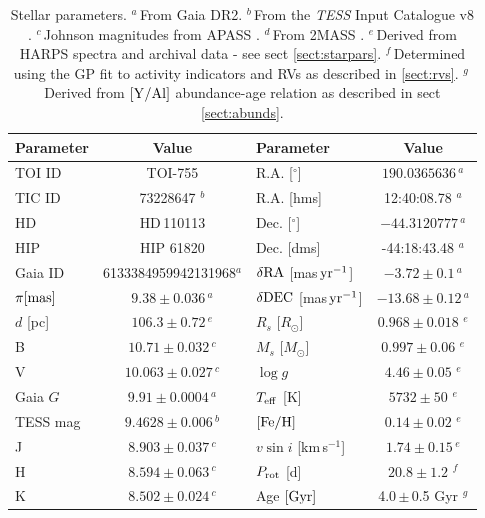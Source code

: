 \documentclass[fleqn,usenatbib]{mnras}
\newcommand{\tess}{{\it TESS}}
\newcommand{\harps}{{HARPS}}
\newcommand{\kms}{km\,s$^{-1}$}
\newcommand{\msun}{\mbox{$M_{\odot}$}}
\newcommand{\rsun}{\mbox{$R_{\odot}$}}
\newcommand{\vsini}{$v\sin{i}$}
\newcommand{\teff}{$T_{\rm eff}$}
\newcommand{\feh}{\mbox{$\rm [Fe/H]$}}
\newcommand{\logg}{$\log g$}
\newcommand{\Tlogg}{ $ 4.46 \pm 0.05 $ }
\newcommand{\TFeH}{ $ 0.14 \pm 0.02 $ }
\newcommand{\TTeff}{ $ 5732 \pm 50 $ }
\newcommand{\Tmstar}{ $ 0.997 \pm 0.06 $ }
\newcommand{\Trstar}{ $ 0.968 \pm 0.018 $ }
\newcommand{\Tperiod}{ $ 20.8 \pm 1.2 $ }
\newcommand{\TTstar}{TOI-755}
\newcommand{\Tstar}{HD\,110113}
\newcommand{\Tstarage}{4.0\,$\pm$\,0.5 Gyr}
\newcommand{\TGAIAid}{6133384959942131968}
\begin{document}
\begin{table}
    \centering
    \begin{tabular}{lc|lc}
        \hline
        \hline
        Parameter & Value & Parameter & Value \\
        \hline
        \hline
        TOI ID & \TTstar & R.A. [$^{\circ}$] & $190.0365636$\,$^{a}$ \\
        TIC ID & 73228647 $^{b}$ & R.A. [hms] & 12:40:08.78 $^{a}$ \\
        HD & \Tstar & Dec. [$^{\circ}$] & $-44.3120777$\,$^{a}$\\
        HIP & HIP 61820 & Dec. [dms] & -44:18:43.48 $^{a}$ \\
        Gaia ID & {\scriptsize \TGAIAid $^{a}$} & $\delta{\rm RA}$ [mas\,${\rm yr}^{-1}$] & $-3.72 \pm 0.1$\,$^{a}$ \\
        $\pi{} [{\rm mas}]$ & $9.38 \pm 0.036$\,$^{a}$ & $\delta{\rm DEC}$ [mas\,${\rm yr}^{-1}$] & $-13.68 \pm 0.12$\,$^{a}$ \\
        $d$ [pc] & $ 106.3\pm0.72$\,$^{e}$ & $R_s$ [\rsun{}] & \Trstar{}$^{e}$ \\
        B & $10.71\pm0.032$\,$^{c}$ & $M_s$ [\msun{}] & \Tmstar{}$^{e}$ \\
        V & $10.063\pm0.027$\,$^{c}$ &  \logg{} & \Tlogg{}$^{e}$ \\
        Gaia $G$ & $9.91\pm0.0004$\,$^{a}$ & \teff{} [K] & \TTeff{}$^{e}$ \\
        TESS mag & $9.4628\pm0.006$\,$^{b}$ & \feh{} & \TFeH{}$^{e}$ \\
        J & $8.903 \pm 0.037$\,$^{c}$ & \vsini{} [\kms{}]& $1.74\pm0.15$\,$^{e}$\\
        H & $8.594 \pm 0.063$\,$^{c}$ & $P_{\rm rot}$ [d] & \Tperiod{}$^{f}$\\
        K & $8.502 \pm0.024$\,$^{c}$ & Age $[{\rm Gyr}]$ & \Tstarage{} $^{g}$ \\
        \hline
        \hline
    \end{tabular}
    \caption{Stellar parameters.
    $^{a}$\,From Gaia DR2\citep{brown2018gaia}. $^{b}$\,From the \tess{} Input Catalogue v8 \citep{stassun2019revised}. $^{c}$\,Johnson magnitudes from APASS \citep{apass}. $^{d}$\,From 2MASS \citep{skrutskie2006two}. $^{e}$\,Derived from \harps{} spectra and archival data - see sect \ref{sect:starpars}. $^{f}$\,Determined using the GP fit to activity indicators and RVs as described in \ref{sect:rvs}. $^{g}$\,Derived from $[\rm{Y}/\rm{Al}]$ abundance-age relation as described in sect \ref{sect:abunds}.}
    \label{tab:starpars}
\end{table}
\end{document}
